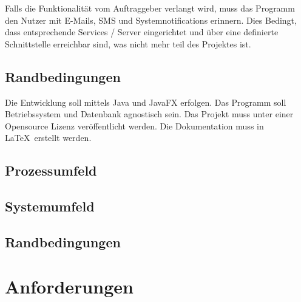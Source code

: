 \documentclass[11pt,titelpage]{scrreprt}
\begin{document}
Falls die Funktionalität vom Auftraggeber verlangt wird, muss das Programm den Nutzer mit E-Mails, SMS und Systemnotifications erinnern. Dies Bedingt, dass entsprechende Services / Server eingerichtet und über eine definierte Schnittstelle erreichbar sind, was nicht mehr teil des Projektes ist.

\subsection{Randbedingungen}
Die Entwicklung soll mittels Java und JavaFX erfolgen.
Das Programm soll Betriebssystem und Datenbank agnostisch sein. Das Projekt muss unter einer Opensource Lizenz veröffentlicht werden.
Die Dokumentation muss in \LaTeX ~erstellt werden.


\subsection{Prozessumfeld}
\subsection{Systemumfeld}
\subsection{Randbedingungen}
\section{Anforderungen}
\end{document}

